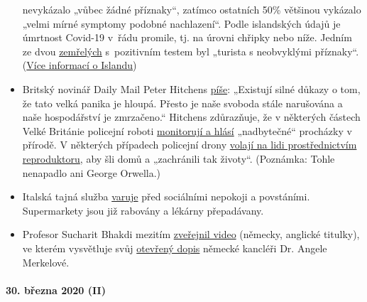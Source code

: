 \begin{itemize}
  nevykázalo „vůbec žádné příznaky``, zatímco ostatních 50\% většinou
  vykázalo „velmi mírné symptomy podobné nachlazení``. Podle islandských
  údajů je úmrtnost Covid-19 v~řádu promile, tj. na úrovni chřipky nebo
  níže. Jedním ze dvou
  \href{https://www.government.is/news/article/?newsid=c65cf658-6eb6-11ea-9462-005056bc4d74}{zemřelých}
  s~pozitivním testem byl „turista s neobvyklými příznaky``.
  (\href{https://www.covid.is/data}{Více informací o Islandu})
\item
  Britský novinář Daily Mail Peter Hitchens
  \href{https://hitchensblog.mailonsunday.co.uk/2020/03/theres-powerful-evidence-this-great-panic-is-foolish-yet-our-freedom-is-still-broken-and-our-economy.html}{píše}:
  „Existují silné důkazy o tom, že tato velká panika je hloupá. Přesto
  je naše svoboda stále narušována a naše hospodářství je zmrzačeno.``
  Hitchens zdůrazňuje, že v některých částech Velké Británie policejní
  roboti \href{https://www.youtube.com/watch?v=fHNxDzLsPeg}{monitorují a
  hlásí} „nadbytečné`` procházky v přírodě. V některých případech
  policejní drony
  \href{https://www.youtube.com/watch?v=D4GEZjUTkqc}{volají na lidi
  prostřednictvím reproduktoru}, aby šli domů a „zachránili tak
  životy``. (Poznámka: Tohle nenapadlo ani George Orwella.)
\item
  Italská tajná služba
  \href{https://www.focus.de/panorama/welt/sorge-vor-sozialen-unruhen-supermaerkte-gepluendert-apotheken-ueberfallen-italiens-geheimdienst-warnt-vor-aufstaenden_id_11826664.html}{varuje}
  před sociálními nepokoji a povstáními. Supermarkety jsou již rabovány
  a lékárny přepadávany.
\item
  Profesor Sucharit Bhakdi mezitím
  \href{https://www.youtube.com/watch?v=LsExPrHCHbw\&feature=emb_title}{zveřejnil
  video} (německy, anglické titulky), ve kterém vysvětluje svůj
  \href{https://swprs.org/open-letter-from-professor-sucharit-bhakdi-to-german-chancellor-dr-angela-merkel/}{otevřený
  dopis} německé kancléři Dr. Angele Merkelové.
\end{itemize}

\hypertarget{30-bux159ezna-2020-ii}{%
\paragraph{30. března 2020 (II)}\label{30-bux159ezna-2020-ii}}

